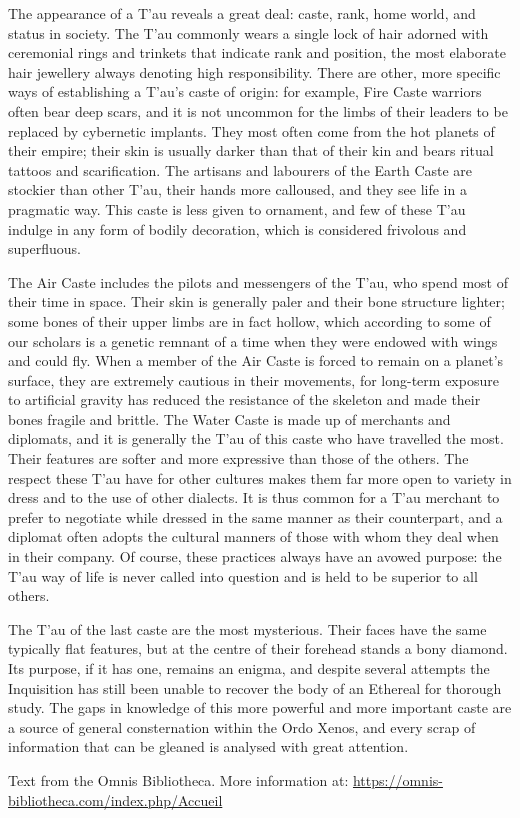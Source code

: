 The appearance of a T'au reveals a great deal: caste, rank, home world, and status in society. The T'au commonly wears a single lock of hair adorned with ceremonial rings and trinkets that indicate rank and position, the most elaborate hair jewellery always denoting high responsibility. There are other, more specific ways of establishing a T'au's caste of origin: for example, Fire Caste warriors often bear deep scars, and it is not uncommon for the limbs of their leaders to be replaced by cybernetic implants. They most often come from the hot planets of their empire; their skin is usually darker than that of their kin and bears ritual tattoos and scarification. The artisans and labourers of the Earth Caste are stockier than other T'au, their hands more calloused, and they see life in a pragmatic way. This caste is less given to ornament, and few of these T'au indulge in any form of bodily decoration, which is considered frivolous and superfluous.

The Air Caste includes the pilots and messengers of the T'au, who spend most of their time in space. Their skin is generally paler and their bone structure lighter; some bones of their upper limbs are in fact hollow, which according to some of our scholars is a genetic remnant of a time when they were endowed with wings and could fly. When a member of the Air Caste is forced to remain on a planet's surface, they are extremely cautious in their movements, for long-term exposure to artificial gravity has reduced the resistance of the skeleton and made their bones fragile and brittle. The Water Caste is made up of merchants and diplomats, and it is generally the T'au of this caste who have travelled the most. Their features are softer and more expressive than those of the others. The respect these T'au have for other cultures makes them far more open to variety in dress and to the use of other dialects. It is thus common for a T'au merchant to prefer to negotiate while dressed in the same manner as their counterpart, and a diplomat often adopts the cultural manners of those with whom they deal when in their company. Of course, these practices always have an avowed purpose: the T'au way of life is never called into question and is held to be superior to all others.

The T'au of the last caste are the most mysterious. Their faces have the same typically flat features, but at the centre of their forehead stands a bony diamond. Its purpose, if it has one, remains an enigma, and despite several attempts the Inquisition has still been unable to recover the body of an Ethereal for thorough study. The gaps in knowledge of this more powerful and more important caste are a source of general consternation within the Ordo Xenos, and every scrap of information that can be gleaned is analysed with great attention.

Text from the Omnis Bibliotheca. More information at: \url{https://omnis-bibliotheca.com/index.php/Accueil}
